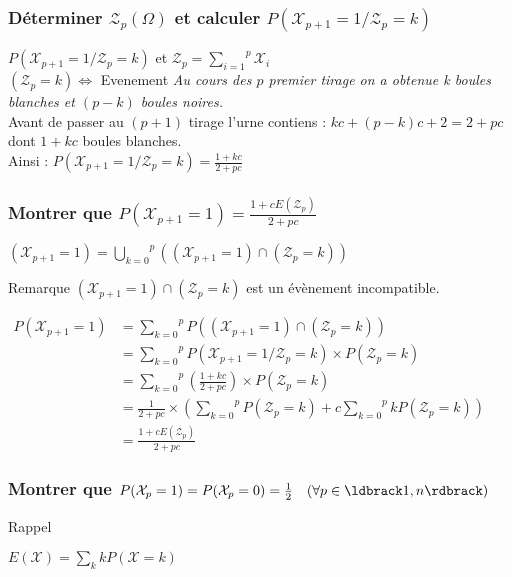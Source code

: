 \documentclass[a4paper, 12pt]{article}
\begin{document}
\subsubsection{Déterminer $\mathcal{Z}_p(\Omega)$ et calculer $P (\mathcal{X}_{p + 1} = 1 / \mathcal{Z}_p = k)$}
$P (\mathcal{X}_{p + 1} = 1 / \mathcal{Z}_p = k)$ et $\mathcal{Z}_p = \overset{p}{\underset{i = 1}{\sum}} \mathcal{X}_i$ \\
$(\mathcal{Z}_p = k) \Leftrightarrow$ Evenement \og{} \textit{Au cours des $p$ premier tirage on a obtenue k boules blanches et $(p - k)$ boules noires.}\fg{} \\
Avant de passer au $(p + 1)$ tirage l'urne contiens : $kc + (p - k)c + 2 = 2 + pc$ dont $1 + kc$ boules blanches. \\
Ainsi : $P (\mathcal{X}_{p + 1} = 1 / \mathcal{Z}_p = k) = \frac{1 + kc}{2 + pc}$


\subsubsection{Montrer que $P (\mathcal{X}_{p + 1} = 1) = \frac{1 + cE(\mathcal{Z}_p)}{2 + pc}$}
$(\mathcal{X}_{p + 1} = 1) = \overset{p}{\underset{k = 0}{\bigcup}} ((\mathcal{X}_{p + 1} = 1) \cap (\mathcal{Z}_p = k))$
\begin{remarque}{Remarque}
$(\mathcal{X}_{p + 1} = 1) \cap (\mathcal{Z}_p = k)$ est un évènement incompatible.
\end{remarque}

$
\begin{aligned}
P (\mathcal{X}_{p + 1} = 1) &= \overset{p}{\underset{k = 0}{\sum}} P ((\mathcal{X}_{p + 1} = 1) \cap (\mathcal{Z}_{p} = k)) \\
&= \overset{p}{\underset{k = 0}{\sum}} P (\mathcal{X}_{p + 1} = 1 / \mathcal{Z}_p = k) \times P (\mathcal{Z}_p = k) \\
&= \overset{p}{\underset{k = 0}{\sum}} (\frac{1 + kc}{2 + pc}) \times P (\mathcal{Z}_p = k) \\
&= \frac{1}{2 + pc} \times (\overset{p}{\underset{k = 0}{\sum}} P (\mathcal{Z}_p = k) + c \overset{p}{\underset{k = 0}{\sum}} k P (\mathcal{Z}_p = k)) \\
&\boxed{= \frac{1 + c E(\mathcal{Z}_p)}{2 + pc}}
\end{aligned}
$


\subsubsection{Montrer que $P (\mathcal{X}_p = 1) = P (\mathcal{X}_p = 0) = \frac{1}{2} \quad (\forall p \in \ldbrack 1, n \rdbrack)$}
\begin{rappel}{Rappel}
{
\Large
\begin{center}
$E(\mathcal{X}) = \underset{k}{\sum} k P (\mathcal{X} = k)$
\end{center}
}
\end{rappel}
\end{document}

